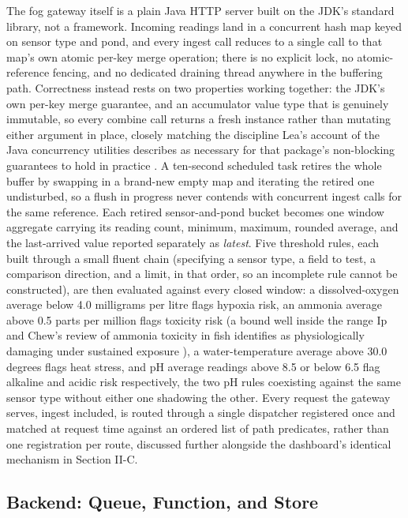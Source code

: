 \documentclass[conference]{IEEEtran}
\begin{document}
The fog gateway itself is a plain Java HTTP server built on the JDK's standard library, not a framework. Incoming readings land in a concurrent hash map keyed on sensor type and pond, and every ingest call reduces to a single call to that map's own atomic per-key merge operation; there is no explicit lock, no atomic-reference fencing, and no dedicated draining thread anywhere in the buffering path. Correctness instead rests on two properties working together: the JDK's own per-key merge guarantee, and an accumulator value type that is genuinely immutable, so every combine call returns a fresh instance rather than mutating either argument in place, closely matching the discipline Lea's account of the Java concurrency utilities describes as necessary for that package's non-blocking guarantees to hold in practice \cite{ref8}. A ten-second scheduled task retires the whole buffer by swapping in a brand-new empty map and iterating the retired one undisturbed, so a flush in progress never contends with concurrent ingest calls for the same reference. Each retired sensor-and-pond bucket becomes one window aggregate carrying its reading count, minimum, maximum, rounded average, and the last-arrived value reported separately as \emph{latest}. Five threshold rules, each built through a small fluent chain (specifying a sensor type, a field to test, a comparison direction, and a limit, in that order, so an incomplete rule cannot be constructed), are then evaluated against every closed window: a dissolved-oxygen average below 4.0 milligrams per litre flags hypoxia risk, an ammonia average above 0.5 parts per million flags toxicity risk (a bound well inside the range Ip and Chew's review of ammonia toxicity in fish identifies as physiologically damaging under sustained exposure \cite{ref9}), a water-temperature average above 30.0 degrees flags heat stress, and pH average readings above 8.5 or below 6.5 flag alkaline and acidic risk respectively, the two pH rules coexisting against the same sensor type without either one shadowing the other. Every request the gateway serves, ingest included, is routed through a single dispatcher registered once and matched at request time against an ordered list of path predicates, rather than one registration per route, discussed further alongside the dashboard's identical mechanism in Section II-C.

\subsection{Backend: Queue, Function, and Store}
\end{document}
